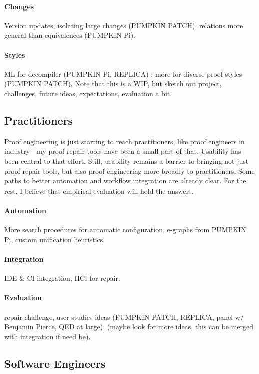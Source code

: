 \paragraph{Changes} Version updates, isolating large changes (PUMPKIN PATCH), relations more general than equivalences (PUMPKIN Pi).

\paragraph{Styles} ML for decompiler (PUMPKIN Pi, REPLICA) : more for diverse proof styles (PUMPKIN PATCH). Note that this is a WIP, but sketch out project, challenges, future ideas, expectations, evaluation a bit.

\subsection*{Practitioners}

Proof engineering is just starting to reach practitioners, like proof engineers in industry---my proof repair tools have been a small part of that.
Usability has been central to that effort.
Still, usability remains a barrier to bringing not just proof repair tools, but also proof engineering 
more broadly to practitioners.
Some paths to better automation and workflow integration are already clear.
For the rest, I believe that empirical evaluation will hold the answers.

\paragraph{Automation} More search procedures for automatic configuration, e-graphs from PUMPKIN Pi, custom unification heuristics.

\paragraph{Integration} IDE \& CI integration, HCI for repair.

\paragraph{Evaluation} repair challenge, user studies ideas (PUMPKIN PATCH, REPLICA, panel w/ Benjamin Pierce, QED at large). (maybe look for more ideas, this can be merged with integration if need be).

\subsection*{Software Engineers}

